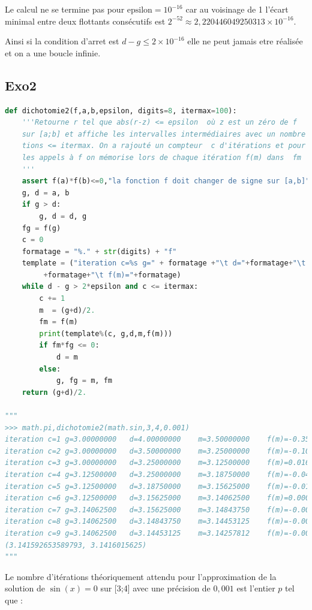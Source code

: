 \documentclass[
  11pt,
]{article}
\newcounter{exo}
\newcounter{def}
\begin{document}
Le calcul ne se termine pas pour \(\text{epsilon} =10^{-16}\) car au
voisinage de 1 l'écart minimal entre deux flottants consécutifs est
\(2^{-52} \approx 2,220446049250313 \times 10^{-16}\).

Ainsi si la condition d'arret est \(d - g \leqslant 2 \times 10^{-16}\)
elle ne peut jamais etre réalisée et on a une boucle infinie.

\hypertarget{exo2}{%
\subsection{Exo2}\label{exo2}}

\begin{lstlisting}[language=Python]
def dichotomie2(f,a,b,epsilon, digits=8, itermax=100):
    '''Retourne r tel que abs(r-z) <= epsilon  où z est un zéro de f 
    sur [a;b] et affiche les intervalles intermédiaires avec un nombre d'itéra-
    tions <= itermax. On a rajouté un compteur  c d'itérations et pour minimiser 
    les appels à f on mémorise lors de chaque itération f(m) dans  fm
    '''
    assert f(a)*f(b)<=0,"la fonction f doit changer de signe sur [a,b]"
    g, d = a, b
    if g > d:
        g, d = d, g
    fg = f(g)
    c = 0
    formatage = "%." + str(digits) + "f"
    template = ("iteration c=%s g=" + formatage +"\t d="+formatage+"\t m="
         +formatage+"\t f(m)="+formatage)
    while d - g > 2*epsilon and c <= itermax:
        c += 1
        m  = (g+d)/2.
        fm = f(m)
        print(template%(c, g,d,m,f(m)))
        if fm*fg <= 0:
            d = m           
        else:
            g, fg = m, fm
    return (g+d)/2.  

"""
>>> math.pi,dichotomie2(math.sin,3,4,0.001)
iteration c=1 g=3.00000000   d=4.00000000    m=3.50000000    f(m)=-0.35078323
iteration c=2 g=3.00000000   d=3.50000000    m=3.25000000    f(m)=-0.10819513
iteration c=3 g=3.00000000   d=3.25000000    m=3.12500000    f(m)=0.01659189
iteration c=4 g=3.12500000   d=3.25000000    m=3.18750000    f(m)=-0.04589122
iteration c=5 g=3.12500000   d=3.18750000    m=3.15625000    f(m)=-0.01465682
iteration c=6 g=3.12500000   d=3.15625000    m=3.14062500    f(m)=0.00096765
iteration c=7 g=3.14062500   d=3.15625000    m=3.14843750    f(m)=-0.00684479
iteration c=8 g=3.14062500   d=3.14843750    m=3.14453125    f(m)=-0.00293859
iteration c=9 g=3.14062500   d=3.14453125    m=3.14257812    f(m)=-0.00098547
(3.141592653589793, 3.1416015625)
"""
\end{lstlisting}

Le nombre d'itérations théoriquement attendu pour l'approximation de la
solution de \(\sin(x) = 0\) sur {[}3;4{]} avec une précision de
\(0,001\) est l'entier \(p\) tel que :
\end{document}
